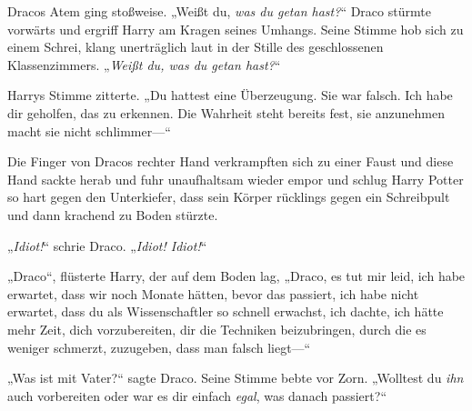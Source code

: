 Dracos Atem ging stoßweise.
„Weißt du, \emph{was du getan hast?}“ Draco stürmte vorwärts und ergriff Harry am Kragen seines Umhangs. Seine Stimme hob sich zu einem Schrei, klang unerträglich laut in der Stille des geschlossenen Klassenzimmers. „\emph{Weißt du, was du getan hast?}“

Harrys Stimme zitterte.
„Du hattest eine Überzeugung. Sie war falsch. Ich habe dir geholfen, das zu erkennen. Die Wahrheit steht bereits fest, sie anzunehmen macht sie nicht schlimmer—“

Die Finger von Dracos rechter Hand verkrampften sich zu einer Faust und diese Hand sackte herab und fuhr unaufhaltsam wieder empor und schlug Harry Potter so hart gegen den Unterkiefer, dass sein Körper rücklings gegen ein Schreibpult und dann krachend zu Boden stürzte.

„\emph{Idiot!}“ schrie Draco. „\emph{Idiot! Idiot!}“

„Draco“, flüsterte Harry, der auf dem Boden lag,
„Draco, es tut mir leid, ich habe erwartet, dass wir noch Monate hätten, bevor das passiert, ich habe nicht erwartet, dass du als Wissenschaftler so schnell erwachst, ich dachte, ich hätte mehr Zeit, dich vorzubereiten, dir die Techniken beizubringen, durch die es weniger schmerzt, zuzugeben, dass man falsch liegt—“

„Was ist mit Vater?“ sagte Draco. Seine Stimme bebte vor Zorn.
„Wolltest du \emph{ihn} auch vorbereiten oder war es dir einfach \emph{egal}, was danach passiert?“

